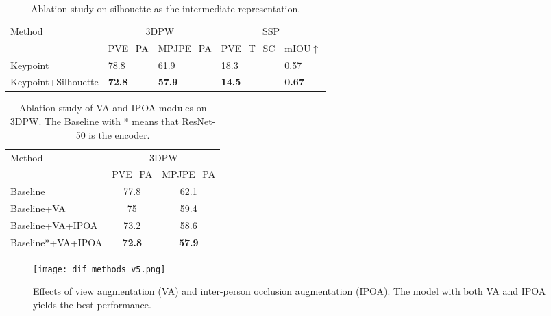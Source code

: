 \documentclass[journal]{IEEEtran}
\begin{document}
{
\begin{table}[!htbp]
\caption{Ablation study on silhouette as the intermediate representation.}
\begin{tabular}{lllll}
\hline
\multirow{2}{*}{Method} & \multicolumn{2}{c}{3DPW}                                    & \multicolumn{2}{c}{SSP}                                   \\
                        & \multicolumn{1}{c}{PVE\_PA } & \multicolumn{1}{c}{MPJPE\_PA } & \multicolumn{1}{c}{PVE\_T\_SC} & \multicolumn{1}{c}{mIOU$\uparrow$} \\ \cline{2-5} 
Keypoint                & 78.8                        & 61.9                          & 18.3                           & 0.57                     \\
Keypoint+Silhouette     & \textbf{72.8}               & \textbf{57.9}                 & \textbf{14.5}                  & \textbf{0.67}            \\ \hline
\end{tabular}
\label{tab:ks}
\end{table}
\vspace{-0.2cm}
}


\begin{table}[!htbp]
\caption{Ablation study of VA and IPOA modules on 3DPW. The Baseline with * means that ResNet-50 is the encoder.}
\begin{center}

\begin{tabular}{@{}lcc@{}}
\toprule
\multirow{2}{*}{Method}         & \multicolumn{2}{c}{3DPW} \\
                                & PVE\_PA    & MPJPE\_PA   \\ \midrule
Baseline                        & 77.8       & 62.1        \\
Baseline+VA               & 75         & 59.4        \\
Baseline+VA+IPOA & 73.2       & 58.6       \\ 
Baseline*+VA+IPOA & \textbf{72.8}       & \textbf{57.9}        \\ \bottomrule
\end{tabular}
\label{3dpw}
\end{center}
\end{table}
\vspace{-0.2cm}

\begin{figure}
    
    \centerline{\texttt{[image: dif\_methods\_v5.png]}}
    \caption{Effects of view augmentation (VA) and inter-person occlusion augmentation (IPOA). The model with both VA and IPOA yields the best performance.}
    \label{fig:dif_methods}
\end{figure}
\end{document}
